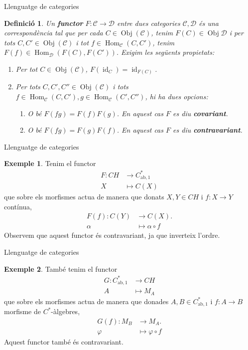 \documentclass{beamer}
\newtheorem{definicio}{Definici\'{o}}
\theoremstyle{definition}
\newtheorem{exemple}{Exemple}
\DeclareMathOperator{\Obj}{Obj}
\DeclareMathOperator{\Hom}{Hom}
\DeclareMathOperator{\id}{id}
\begin{document}
\begin{frame}{Llenguatge de categories}
\begin{definicio}
Un \textbf{functor} $F:\mathcal{C}\rightarrow\mathcal{D}$ entre dues categories $\mathcal{C},\mathcal{D}$ \'{e}s una correspond\`{e}ncia tal que per cada $C\in\Obj(\mathcal{C})$, tenim $F(C)\in\Obj\mathcal{D}$ i per tots $C,C'\in\Obj(\mathcal{C})$ i tot $f\in\Hom_{\mathcal{C}}(C,C')$, tenim $F(f)\in\Hom_{\mathcal{D}}(F(C),F(C'))$. Exigim les seg\"{u}ents propietats:
\pause
\begin{enumerate}
\item Per tot $C\in\Obj(\mathcal{C})$, $F(\id_C)=\id_{F(C)}$.
\item Per tots $C,C',C''\in\Obj(\mathcal{C})$ i tots $f\in\Hom_{\mathcal{C}}(C,C'),g\in\Hom_{\mathcal{C}}(C',C'')$, hi ha dues opcions:
\begin{enumerate}
\item O b\'{e} $F(fg)=F(f)F(g)$. En aquest cas $F$ es diu \textbf{covariant}.
\item O b\'{e} $F(fg)=F(g)F(f)$. En aquest cas $F$ es diu \textbf{contravariant}.
\end{enumerate}
\end{enumerate}
\end{definicio}
\end{frame}

\begin{frame}{Llenguatge de categories}
\begin{exemple}
Tenim el functor
\begin{align*}
F:CH&\longrightarrow C_{\text{ab},1}^*\\
X&\longmapsto C(X)
\end{align*}
que sobre els morfismes actua de manera que donats $X,Y\in CH$ i $f:X\rightarrow Y$ cont\'{i}nua,
\begin{align*}
F(f):C(Y)&\longrightarrow C(X).\\
\alpha&\longmapsto\alpha\circ f
\end{align*}
Observem que aquest functor \'{e}s contravariant, ja que inverteix l'ordre.
\end{exemple}
\end{frame}

\begin{frame}{Llenguatge de categories}
\begin{exemple}
Tamb\'{e} tenim el functor
\begin{align*}
G:C_{\text{ab},1}^*&\longrightarrow CH\\
A&\longmapsto M_A
\end{align*}
que sobre els morfismes actua de manera que donades $A,B\in C_{\text{ab},1}^*$ i $f:A\rightarrow B$ morfisme de $C^*$-\`{a}lgebres,
\begin{align*}
G(f):M_B&\longrightarrow M_A.\\
\varphi&\longmapsto\varphi\circ f
\end{align*}
Aquest functor tamb\'{e} \'{e}s contravariant.
\end{exemple}
\end{frame}
\end{document}
